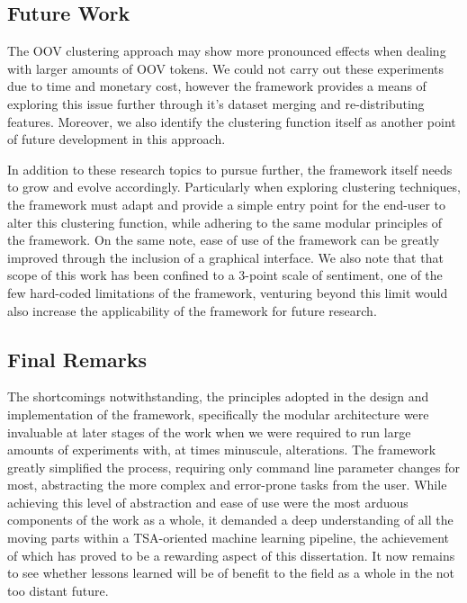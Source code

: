 \documentclass[../../fyp.tex]{subfiles}
\begin{document}
\subsection{Future Work}
The OOV clustering approach may show more pronounced effects when dealing with larger amounts of OOV tokens. We could not carry out these experiments due to time and monetary cost, however the framework provides a means of exploring this issue further through it's dataset merging and re-distributing features. Moreover, we also identify the clustering function itself as another point of future development in this approach. 

In addition to these research topics to pursue further, the framework itself needs to grow and evolve accordingly. Particularly when exploring clustering techniques, the framework must adapt and provide a simple entry point for the end-user to alter this clustering function, while adhering to the same modular principles of the framework. On the same note, ease of use of the framework can be greatly improved through the inclusion of a graphical interface. We also note that that scope of this work has been confined to a 3-point scale of sentiment, one of the few hard-coded limitations of the framework, venturing beyond this limit would also increase the applicability of the framework for future research. 

\subsection{Final Remarks}
The shortcomings notwithstanding, the principles adopted in the design and implementation of the framework, specifically the modular architecture were invaluable at later stages of the work when we were required to run large amounts of experiments with, at times minuscule, alterations. The framework greatly simplified the process, requiring only command line parameter changes for most, abstracting the more complex and error-prone tasks from the user. While achieving this level of abstraction and ease of use were the most arduous components of the work as a whole, it demanded a deep understanding of all the moving parts within a TSA-oriented machine learning pipeline, the achievement of which has proved to be a rewarding aspect of this dissertation. It now remains to see whether lessons learned will be of benefit to the field as a whole in the not too distant future.

% 

% 
\end{document}

